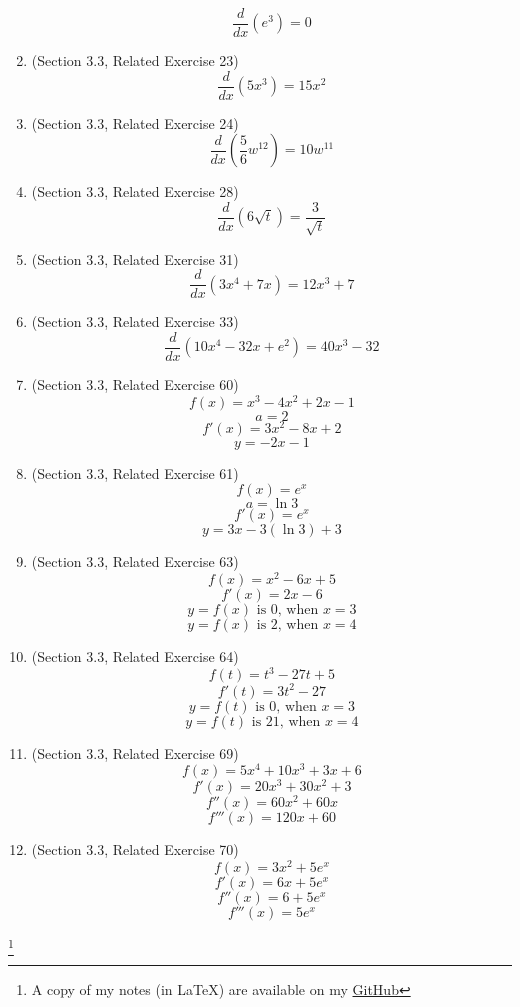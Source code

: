 \documentclass{article}
\newcommand\blfootnote[1]{
    \begingroup
    \renewcommand\thefootnote{}\footnote{#1}
    \addtocounter{footnote}{-1}
    \endgroup
}
\begin{document}
\begin{enumerate}
        $$\frac{d}{dx}\left(e^3\right) = 0$$
    \item (Section 3.3, Related Exercise 23)
        $$\frac{d}{dx}\left(5x^3\right) = 15x^2$$
    \item (Section 3.3, Related Exercise 24)
        $$\frac{d}{dx}\left(\frac{5}{6}w^{12}\right) = 10w^{11}$$
    \item (Section 3.3, Related Exercise 28)
        $$\frac{d}{dx}\left(6\sqrt{t}\right) = \frac{3}{\sqrt{t}}$$
    \item (Section 3.3, Related Exercise 31)
        $$\frac{d}{dx}\left(3x^4 + 7x\right) = 12x^3 + 7$$
    \item (Section 3.3, Related Exercise 33)
        $$\frac{d}{dx}\left(10x^4 - 32x + e^2\right) = 40x^3 - 32$$
    \item (Section 3.3, Related Exercise 60)
        $$f(x) = x^3 - 4x^2 + 2x - 1$$
        $$a = 2$$
        $$f'(x) = 3x^2 - 8x + 2$$
        $$y = -2x - 1$$
    \item (Section 3.3, Related Exercise 61)
        $$f(x) = e^x$$
        $$a = \ln{3}$$
        $$f'(x) = e^x$$
        $$y = 3x - 3(\ln{3}) + 3$$
    \item (Section 3.3, Related Exercise 63)
        $$f(x) = x^2 - 6x + 5$$
        $$f'(x) = 2x - 6$$
        $$y = f(x) \text{ is } 0 \text{, when } x = 3$$
        $$y = f(x) \text{ is } 2 \text{, when } x = 4$$
    \item (Section 3.3, Related Exercise 64)
        $$f(t) = t^3 - 27t + 5$$
        $$f'(t) = 3t^2 - 27$$
        $$y = f(t) \text{ is } 0 \text{, when } x = 3$$
        $$y = f(t) \text{ is } 21 \text{, when } x = 4$$
    \item (Section 3.3, Related Exercise 69)
        $$f(x) = 5x^4 + 10x^3 + 3x + 6$$
        $$f'(x) = 20x^3 + 30x^2 + 3$$
        $$f''(x) = 60x^2 + 60x$$
        $$f'''(x) = 120x + 60$$
    \item (Section 3.3, Related Exercise 70)
        $$f(x) = 3x^2 + 5e^x$$
        $$f'(x) = 6x + 5e^x$$
        $$f''(x) = 6 + 5e^x$$
        $$f'''(x) = 5e^x$$
\end{enumerate}

\blfootnote{A copy of my notes (in \LaTeX) are available on my \href{https://github.com/onlinechronically/MATH-211}{GitHub}}
\end{document}

